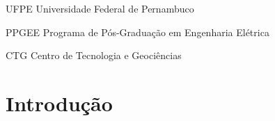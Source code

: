 \documentclass[
	12pt,				%
	openright,			%
  oneside,     %
	a4paper,			%
	english,			%
	french,				%
	spanish,			%
	brazil				%
	]{abntex2}
\begin{document}
\listoffigures*
\cleardoublepage

\listoftables*
\cleardoublepage

\begin{siglas}
\item[UFPE] Universidade Federal de Pernambuco
\item[PPGEE] Programa de Pós-Graduação em Engenharia Elétrica
\item[CTG] Centro de Tecnologia e Geociências
\end{siglas}


\tableofcontents*
\cleardoublepage

\textual

%
%

\chapter*[Introdução]{Introdução}
\end{document}
